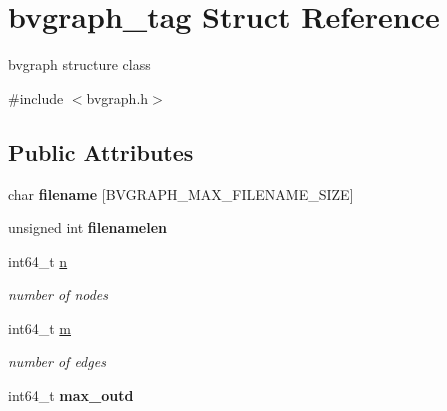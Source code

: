\hypertarget{structbvgraph__tag}{\section{bvgraph\+\_\+tag Struct Reference}
\label{structbvgraph__tag}
}


bvgraph structure class  




{\ttfamily \#include $<$bvgraph.\+h$>$}

\subsection*{Public Attributes}
\begin{DoxyCompactItemize}
\item 
\hypertarget{structbvgraph__tag_a99c319c4855573eca03ff0e600b54122}{char {\bfseries filename} \mbox{[}B\+V\+G\+R\+A\+P\+H\+\_\+\+M\+A\+X\+\_\+\+F\+I\+L\+E\+N\+A\+M\+E\+\_\+\+S\+I\+Z\+E\mbox{]}}\label{structbvgraph__tag_a99c319c4855573eca03ff0e600b54122}

\item 
\hypertarget{structbvgraph__tag_a8578cd6ce60aed215def2c9218555fc5}{unsigned int {\bfseries filenamelen}}\label{structbvgraph__tag_a8578cd6ce60aed215def2c9218555fc5}

\item 
\hypertarget{structbvgraph__tag_a38d272f00663a3d95e634186dea01bdc}{int64\+\_\+t \hyperlink{structbvgraph__tag_a38d272f00663a3d95e634186dea01bdc}{n}}\label{structbvgraph__tag_a38d272f00663a3d95e634186dea01bdc}

\begin{DoxyCompactList}\small\item\em number of nodes \end{DoxyCompactList}\item 
\hypertarget{structbvgraph__tag_aaaf5560b092ad319ba1ddfd7d085d941}{int64\+\_\+t \hyperlink{structbvgraph__tag_aaaf5560b092ad319ba1ddfd7d085d941}{m}}\label{structbvgraph__tag_aaaf5560b092ad319ba1ddfd7d085d941}

\begin{DoxyCompactList}\small\item\em number of edges \end{DoxyCompactList}\item 
\hypertarget{structbvgraph__tag_abacde0b3e599c3e7354a2d140bbc363e}{int64\+\_\+t {\bfseries max\+\_\+outd}}\label{structbvgraph__tag_abacde0b3e599c3e7354a2d140bbc363e}


\end{DoxyCompactItemize}
